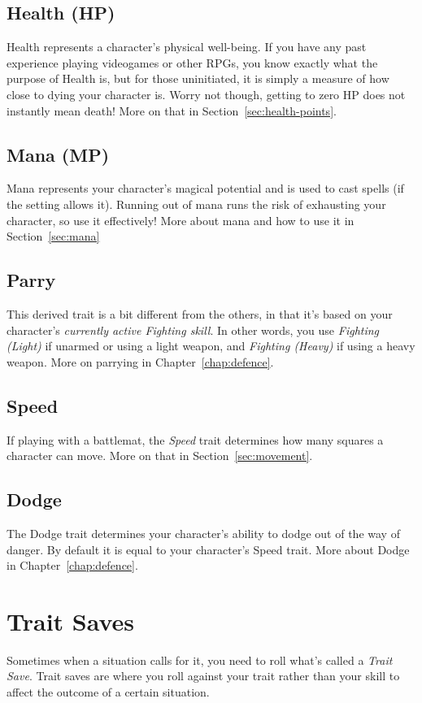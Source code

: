 \subsection{Health (HP)}
Health represents a character's physical well-being.
If you have any past experience playing videogames or other RPGs, you know exactly what the purpose of Health is, but for those uninitiated, it is simply a measure of how close to dying your character is.
Worry not though, getting to zero HP does not instantly mean death!
More on that in Section~\ref{sec:health-points}.

\subsection{Mana (MP)}
Mana represents your character's magical potential and is used to cast spells (if the setting allows it).
Running out of mana runs the risk of exhausting your character, so use it effectively!
More about mana and how to use it in Section~\ref{sec:mana}

\subsection{Parry}
This derived trait is a bit different from the others, in that it's based on your character's \textit{currently active Fighting skill}.
In other words, you use \textit{Fighting (Light)} if unarmed or using a light weapon, and \textit{Fighting (Heavy)} if using a heavy weapon.
More on parrying in Chapter~\ref{chap:defence}.

\subsection{Speed}
If playing with a battlemat, the \textit{Speed} trait determines how many squares a character can move.
More on that in Section~\ref{sec:movement}.

\subsection{Dodge}
The Dodge trait determines your character's ability to dodge out of the way of danger. 
By default it is equal to your character's Speed trait.
More about Dodge in Chapter~\ref{chap:defence}.


\section{Trait Saves}
Sometimes when a situation calls for it, you need to roll what's called a \textit{Trait Save}.
Trait saves are where you roll against your trait rather than your skill to affect the outcome of a certain situation.

